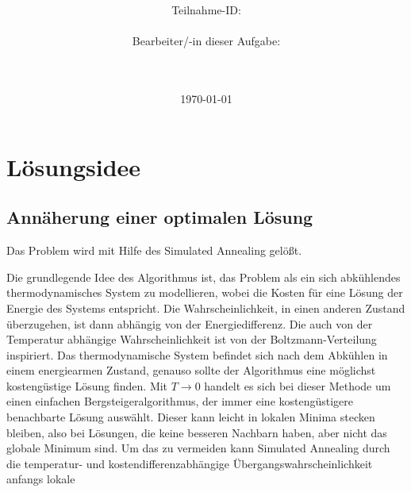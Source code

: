 \documentclass[a4paper,10pt,ngerman]{scrartcl}
\title{\textbf{\Huge\Aufgabe}}
\author{\LARGE Teilnahme-ID: \LARGE \TeilnahmeId \\\\
  \LARGE Bearbeiter/-in dieser Aufgabe: \\
  \LARGE \Name\\\\}
\date{\LARGE\today}
\begin{document}
\maketitle
\tableofcontents

\vspace{0.5cm}

\section{Lösungsidee}
\subsection{Annäherung einer optimalen Lösung}
Das Problem wird mit Hilfe des Simulated Annealing \cite{kirkpatrick_1983}
gelößt.
\begin{algorithmic}
  \EndIf
  \EndIf
  \EndFor

  \EndProcedure
\end{algorithmic}
Die grundlegende Idee des Algorithmus ist, das Problem als ein sich abkühlendes thermodynamisches System zu modellieren,
wobei die Kosten für eine Lösung der Energie des Systems entspricht. Die Wahrscheinlichkeit, in einen anderen
Zustand überzugehen, ist dann abhängig von der Energiedifferenz. Die auch von der Temperatur abhängige Wahrscheinlichkeit
ist von der Boltzmann-Verteilung inspiriert. Das thermodynamische System befindet sich nach dem Abkühlen in einem
energiearmen Zustand, genauso sollte der Algorithmus eine möglichst kostengüstige Lösung finden. Mit $T\to 0$ handelt es sich
bei dieser Methode um einen einfachen Bergsteigeralgorithmus, der immer eine kostengüstigere benachbarte Lösung auswählt. Dieser
kann leicht in lokalen Minima stecken bleiben, also bei Lösungen, die keine besseren Nachbarn haben, aber nicht das globale Minimum sind.
Um das zu vermeiden kann Simulated Annealing durch die temperatur- und kostendifferenzabhängige Übergangswahrscheinlichkeit anfangs lokale
\end{document}
